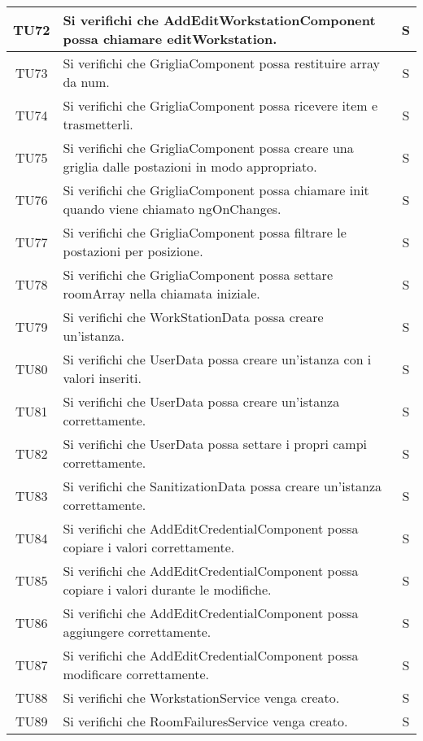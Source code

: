 \begin{center}
\begin{longtable}{|c|p{10cm}|c|}
			\hline
			TU72 & Si verifichi che AddEditWorkstationComponent possa chiamare editWorkstation. & S \\	
			\hline
			TU73 & Si verifichi che GrigliaComponent possa restituire array da num. & S \\	
			\hline
			TU74 & Si verifichi che GrigliaComponent possa ricevere item e trasmetterli. & S \\	
			\hline
			TU75 & Si verifichi che GrigliaComponent possa creare una griglia dalle postazioni in modo appropriato. & S \\	
			\hline
			TU76 & Si verifichi che GrigliaComponent possa chiamare init quando viene chiamato ngOnChanges. & S \\	
			\hline
			TU77 & Si verifichi che GrigliaComponent possa filtrare le postazioni per posizione. & S \\	
			\hline
			TU78 & Si verifichi che GrigliaComponent possa settare roomArray nella chiamata iniziale. & S \\	
			\hline
			TU79 & Si verifichi che WorkStationData possa creare un'istanza. & S \\	
			\hline
			TU80 & Si verifichi che UserData possa creare un'istanza con i valori inseriti. & S \\	
			\hline
			TU81 & Si verifichi che UserData possa creare un'istanza correttamente. & S \\	
			\hline
			TU82 & Si verifichi che UserData possa settare i propri campi correttamente. & S \\	
			\hline
			TU83 & Si verifichi che SanitizationData possa creare un'istanza correttamente. & S \\	
			\hline
			TU84 & Si verifichi che AddEditCredentialComponent possa copiare i valori correttamente. & S \\	
			\hline
			TU85 & Si verifichi che AddEditCredentialComponent possa copiare i valori durante le modifiche. & S \\	
			\hline
			TU86 & Si verifichi che AddEditCredentialComponent possa aggiungere correttamente. & S \\	
			\hline
			TU87 & Si verifichi che AddEditCredentialComponent possa modificare correttamente. & S \\	
			\hline
			TU88 & Si verifichi che WorkstationService venga creato. & S \\	
			\hline
			TU89 & Si verifichi che RoomFailuresService venga creato. & S \\	
			\hline
			

\end{longtable}
\end{center}
